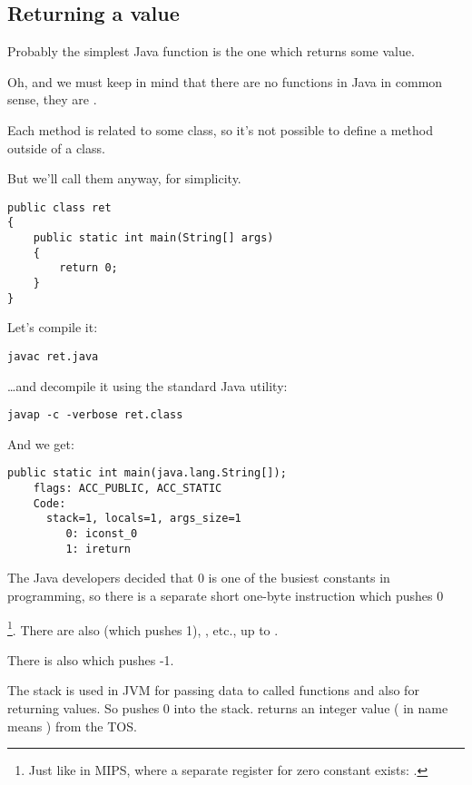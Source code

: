 \subsection{Returning a value}

Probably the simplest Java function is the one which returns some value.

Oh, and we must keep in mind that there are no  functions in Java in common sense,
they are . 

Each method is related to some class, so it's not possible to define
a method outside of a class.

But we'll call them  anyway, for simplicity.

\begin{lstlisting}
public class ret
{
	public static int main(String[] args) 
	{
		return 0;
	}
}
\end{lstlisting}

Let's compile it:

\begin{lstlisting}
javac ret.java
\end{lstlisting}

\dots and decompile it using the standard Java utility:

\begin{lstlisting}
javap -c -verbose ret.class
\end{lstlisting}

And we get:

\begin{lstlisting}[caption=JDK 1.7 (excerpt)]
  public static int main(java.lang.String[]);
    flags: ACC_PUBLIC, ACC_STATIC
    Code:
      stack=1, locals=1, args_size=1
         0: iconst_0      
         1: ireturn       
\end{lstlisting}

The Java developers decided that 0 is one of the busiest constants in programming, 
so there is a separate short one-byte  instruction which pushes 0

\footnote{Just like in MIPS, where a separate register for zero constant exists: .}.
There are also  (which pushes 1), , etc., up to .

There is also  which pushes -1.

The stack is used in JVM for passing data to called functions and also for returning values.
So  pushes 0 into the stack.
 returns an integer value ( in name means ) from the \ac{TOS}.

